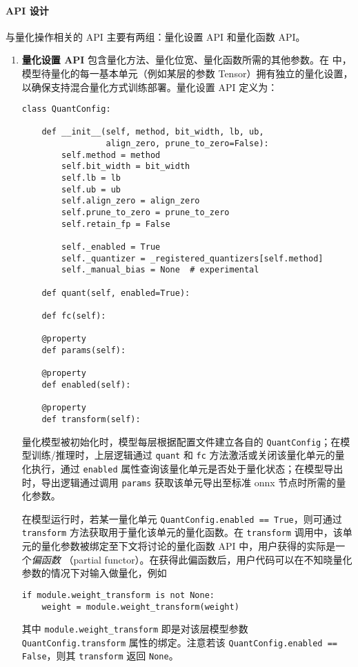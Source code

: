 \paragraph{API 设计}
\QP 与量化操作相关的 API 主要有两组：量化设置 API 和量化函数 API。
\begin{enumerate}
  \item \textbf{量化设置 API} 包含量化方法、量化位宽、量化函数所需的其他参数。在 \QP 中，模型待量化的每一基本单元（例如某层的参数 Tensor）拥有独立的量化设置，以确保支持混合量化方式训练部署。量化设置 API 定义为：
    \begin{verbatim}
class QuantConfig:

    def __init__(self, method, bit_width, lb, ub,
                 align_zero, prune_to_zero=False):
        self.method = method
        self.bit_width = bit_width
        self.lb = lb
        self.ub = ub
        self.align_zero = align_zero
        self.prune_to_zero = prune_to_zero
        self.retain_fp = False

        self._enabled = True
        self._quantizer = _registered_quantizers[self.method]
        self._manual_bias = None  # experimental
    
    def quant(self, enabled=True):

    def fc(self):
    
    @property
    def params(self):

    @property
    def enabled(self):

    @property
    def transform(self):
    \end{verbatim}
    量化模型被初始化时，模型每层根据配置文件建立各自的 \verb|QuantConfig|；在模型训练/推理时，上层逻辑通过 \verb|quant| 和 \verb|fc| 方法激活或关闭该量化单元的量化执行，通过 \verb|enabled| 属性查询该量化单元是否处于量化状态；在模型导出时，导出逻辑通过调用 \verb|params| 获取该单元导出至标准 onnx 节点时所需的量化参数。

    在模型运行时，若某一量化单元 \verb|QuantConfig.enabled == True|，则可通过 \verb|transform| 方法获取用于量化该单元的量化函数。在 \verb|transform| 调用中，该单元的量化参数被绑定至下文将讨论的量化函数 API 中，用户获得的实际是一个\emph{偏函数} （partial functor）。在获得此偏函数后，用户代码可以在不知晓量化参数的情况下对输入做量化，例如
    \begin{verbatim}
if module.weight_transform is not None:
    weight = module.weight_transform(weight)
    \end{verbatim}
    其中 \verb|module.weight_transform| 即是对该层模型参数 \verb|QuantConfig.transform| 属性的绑定。注意若该 \verb|QuantConfig.enabled == False|，则其 \verb|transform| 返回 \verb|None|。
  

\end{enumerate}
